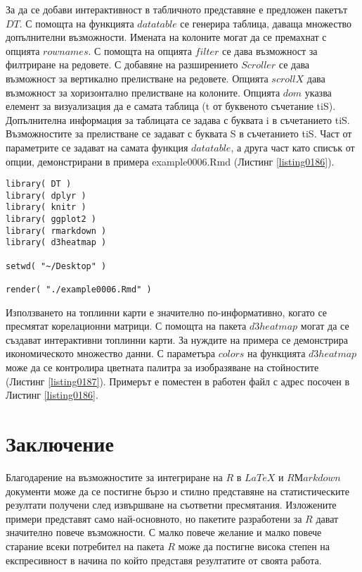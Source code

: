 За да се добави интерактивност в табличното представяне е предложен пакетът $DT$. С помощта на функцията $datatable$ се генерира таблица, даваща множество допълнителни възможности. Имената на колоните могат да се премахнат с опцията $rownames$. С помощта на опцията $filter$ се дава възможност за филтриране на редовете. С добавяне на разширението $Scroller$ се дава възможност за вертикално прелистване на редовете. Опцията $scrollX$ дава възможност за хоризонтално прелистване на колоните. Опцията $dom$ указва елемент за визуализация да е самата таблица (t от буквеното съчетание tiS). Допълнителна информация за таблицата се задава с буквата i в съчетанието tiS. Възможностите за прелистване се задават с буквата S в съчетанието tiS. Част от параметрите се задават на самата функция $datatable$, а друга част като списък от опции, демонстрирани в примера example0006.Rmd (Листинг \ref{listing0186}).

\begin{lstlisting}[caption=Създаване на интерактивни документи, label=listing0187]
library( DT )
library( dplyr )
library( knitr )
library( ggplot2 )
library( rmarkdown )
library( d3heatmap )

setwd( "~/Desktop" )

render( "./example0006.Rmd" )
\end{lstlisting}

Използването на топлинни карти е значително по-информативно, когато се пресмятат корелационни матрици. С помощта на пакета $d3heatmap$ могат да се създават интерактивни топлинни карти. За нуждите на примера се демонстрира икономическото множество данни. С параметъра $colors$ на функцията $d3heatmap$ може да се контролира цветната палитра за изобразяване на стойностите (Листинг \ref{listing0187}). Примерът е поместен в работен файл с адрес посочен в Листинг \ref{listing0186}.

\section*{Заключение}

Благодарение на възможностите за интегриране на $R$ в $LaTeX$ и $RМarkdown$ документи може да се постигне бързо и стилно представяне на статистическите резултати получени след извършване на съответни пресмятания. Изложените примери представят само най-основното, но пакетите разработени за $R$ дават значително повече възможности. С малко повече желание и малко повече старание всеки потребител на пакета $R$ може да постигне висока степен на експресивност в начина по който представя резултатите от своята работа.

